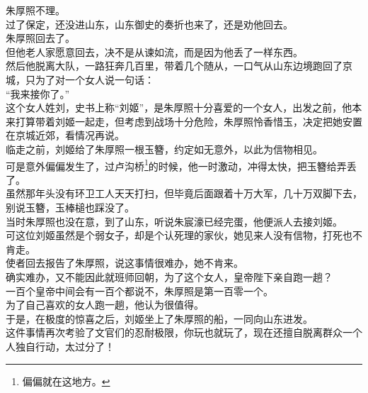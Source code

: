 \begin{multicols}{\theparacolNo}
朱厚照不理。\\

过了保定，还没进山东，山东御史的奏折也来了，还是劝他回去。\\

朱厚照回去了。\\

但他老人家愿意回去，决不是从谏如流，而是因为他丢了一样东西。\\

然后他脱离大队，一路狂奔几百里，带着几个随从，一口气从山东边境跑回了京城，只为了对一个女人说一句话：\\

“我来接你了。”\\

这个女人姓刘，史书上称“刘姬”，是朱厚照十分喜爱的一个女人，出发之前，他本来打算带着刘姬一起走，但考虑到战场十分危险，朱厚照怜香惜玉，决定把她安置在京城近郊，看情况再说。\\

临走之前，刘姬给了朱厚照一根玉簪，约定如无意外，以此为信物相见。\\

可是意外偏偏发生了，过卢沟桥\footnote{偏偏就在这地方。}的时候，他一时激动，冲得太快，把玉簪给弄丢了。\\

虽然那年头没有环卫工人天天打扫，但毕竟后面跟着十万大军，几十万双脚下去，别说玉簪，玉棒槌也踩没了。\\

当时朱厚照也没在意，到了山东，听说朱宸濠已经完蛋，他便派人去接刘姬。\\

可这位刘姬虽然是个弱女子，却是个认死理的家伙，她见来人没有信物，打死也不肯走。\\

使者回去报告了朱厚照，说这事情很难办，她不肯来。\\

确实难办，又不能因此就班师回朝，为了这个女人，皇帝陛下亲自跑一趟？\\

一百个皇帝中间会有一百个都说不，朱厚照是第一百零一个。\\

为了自己喜欢的女人跑一趟，他认为很值得。\\

于是，在极度的惊喜之后，刘姬坐上了朱厚照的船，一同向山东进发。\\

这件事情再次考验了文官们的忍耐极限，你玩也就玩了，现在还擅自脱离群众一个人独自行动，太过分了！\\


\end{multicols}
